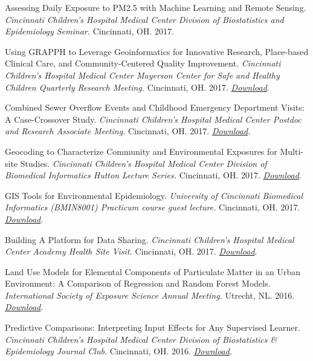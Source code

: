 Assessing Daily Exposure to PM2.5 with Machine Learning and Remote
Sensing. \emph{Cincinnati Children's Hospital Medical Center Division of
Biostatistics and Epidemiology Seminar.} Cincinnati, OH. 2017.

Using GRAPPH to Leverage Geoinformatics for Innovative Research,
Place-based Clinical Care, and Community-Centered Quality Improvement.
\emph{Cincinnati Children's Hospital Medical Center Mayerson Center for
Safe and Healthy Children Quarterly Research Meeting.} Cincinnati, OH.
2017.
\emph{\href{http://colebrokamp-website.s3.amazonaws.com/talks/GRAPPH_talk_MayersonCenter_16June2017.pdf}{Download}}.

Combined Sewer Overflow Events and Childhood Emergency Department
Visits: A Case-Crossover Study. \emph{Cincinnati Children's Hospital
Medical Center Postdoc and Research Associate Meeting.} Cincinnati, OH.
2017.
\emph{\href{http://colebrokamp-website.s3.amazonaws.com/talks/cso_talk_3_April_2017.pdf}{Download}}.

Geocoding to Characterize Community and Environmental Exposures for
Multi-site Studies. \emph{Cincinnati Children's Hospital Medical Center
Division of Biomedical Informatics Hutton Lecture Series.} Cincinnati,
OH. 2017.
\emph{\href{http://colebrokamp-website.s3.amazonaws.com/talks/DeGAUSS_talk_Hutton.pdf}{Download}}.

GIS Tools for Environmental Epidemiology. \emph{University of Cincinnati
Biomedical Informatics (BMIN8001) Practicum course guest lecture.}
Cincinnati, OH. 2017.
\emph{\href{http://colebrokamp-website.s3.amazonaws.com/talks/BMIN8001_environmental_epidemiology.pdf}{Download}}.

Building A Platform for Data Sharing. \emph{Cincinnati Children's
Hospital Medical Center Academy Health Site Visit.} Cincinnati, OH.
2017.
\emph{\href{http://colebrokamp-website.s3.amazonaws.com/talks/academy_health_visit.pdf}{Download}}.

Land Use Models for Elemental Components of Particulate Matter in an
Urban Environment: A Comparison of Regression and Random Forest Models.
\emph{International Society of Exposure Science Annual Meeting.}
Utrecht, NL. 2016.
\emph{\href{http://colebrokamp-website.s3.amazonaws.com/talks/LUR_vs_LURF_Cole_Brokamp.pdf}{Download}}.

Predictive Comparisons: Interpreting Input Effects for Any Supervised
Learner. \emph{Cincinnati Children's Hospital Medical Center Division of
Biostatistics \& Epidemiology Journal Club.} Cincinnati, OH. 2016.
\emph{\href{http://colebrokamp-website.s3.amazonaws.com/talks/APC_talk.pdf}{Download}}.

